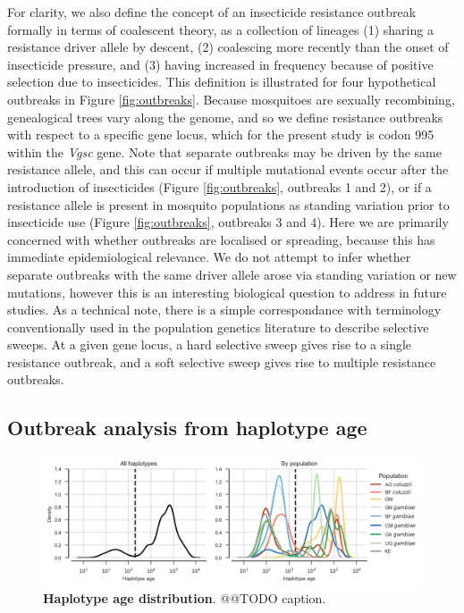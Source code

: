 \documentclass[a4paper,11pt,abstracton]{scrartcl}
\begin{document}
%
For clarity, we also define the concept of an insecticide resistance outbreak formally in terms of coalescent theory, as a collection of lineages (1) sharing a resistance driver allele by descent, (2) coalescing more recently than the onset of insecticide pressure, and (3) having increased in frequency because of positive selection due to insecticides. 
%
This definition is illustrated for four hypothetical outbreaks in Figure \ref{fig:outbreaks}.
%
Because mosquitoes are sexually recombining, genealogical trees vary along the genome, and so we define resistance outbreaks with respect to a specific gene locus, which for the present study is codon 995 within the \textit{Vgsc} gene.
%
Note that separate outbreaks may be driven by the same resistance allele, and this can occur if multiple mutational events occur after the introduction of insecticides (Figure \ref{fig:outbreaks}, outbreaks 1 and 2), or if a resistance allele is present in mosquito populations as standing variation prior to insecticide use (Figure \ref{fig:outbreaks}, outbreaks 3 and 4).
%
Here we are primarily concerned with whether outbreaks are localised or spreading, because this has immediate epidemiological relevance.
%
We do not attempt to infer whether separate outbreaks with the same driver allele arose via standing variation or new mutations, however this is an interesting biological question to address in future studies.
%
As a technical note, there is a simple correspondance with terminology conventionally used in the population genetics literature to describe selective sweeps.
%
At a given gene locus, a hard selective sweep gives rise to a single resistance outbreak, and a soft selective sweep gives rise to multiple resistance outbreaks.


\subsection*{Outbreak analysis from haplotype age}


%
\begin{figure}[!b]
  \includegraphics[width=1.1\linewidth,center]{artwork/haplotype_age_dist.png}
  \caption{\textbf{Haplotype age distribution}. @@TODO caption.}
  \label{fig:age_hist}
\end{figure}
\end{document}
